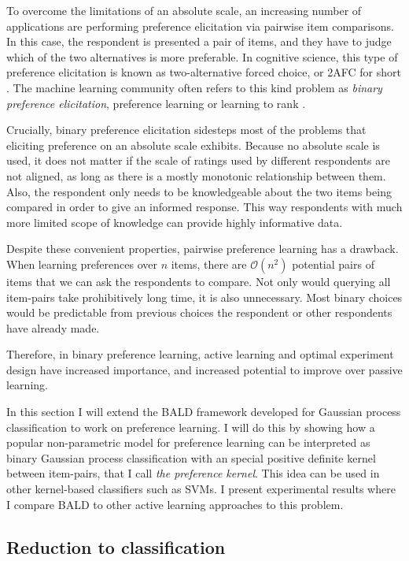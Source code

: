 To overcome the limitations of an absolute scale, an increasing number of applications are performing preference elicitation via pairwise item comparisons. In this case, the respondent is presented a pair of items, and they have to judge which of the two alternatives is more preferable. In cognitive science, this type of preference elicitation is known as two-alternative forced choice, or 2AFC for short \citep{Fechner1860,Platt1999,Huszar2010}. The machine learning community often refers to this kind problem as \emph{binary preference elicitation}, preference learning or learning to rank \citep{Chu2005,furnkranz2010}.

Crucially, binary preference elicitation sidesteps most of the problems that eliciting preference on an absolute scale exhibits. Because no absolute scale is used, it does not matter if the scale of ratings used by different respondents are not aligned, as long as there is a mostly monotonic relationship between them. Also, the respondent only needs to be knowledgeable about the two items being compared in order to give an informed response. This way respondents with much more limited scope of knowledge can provide highly informative data.

Despite these convenient properties, pairwise preference learning has a drawback. When learning preferences over $n$ items, there are $\mathcal{O}(n^2)$ potential pairs of items that we can ask the respondents to compare. Not only would querying all item-pairs take prohibitively long time, it is also unnecessary. Most binary choices would be predictable from previous choices the respondent or other respondents have already made.

Therefore, in binary preference learning, active learning and optimal experiment design have increased importance, and increased potential to improve over passive learning.

In this section I will extend the BALD framework developed for Gaussian process classification to work on preference learning. I will do this by showing how a popular non-parametric model for preference learning can be interpreted as binary Gaussian process classification with an special positive definite kernel between item-pairs, that I call \emph{the preference kernel}. This idea can be used in other kernel-based classifiers such as SVMs. I present experimental results where I compare BALD to other active learning approaches to this problem.

\subsection{Reduction to classification\label{sec:prefKernel}}

